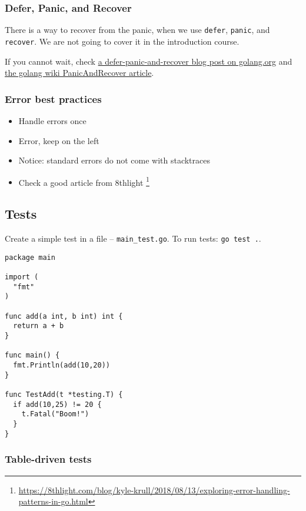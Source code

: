 \documentclass[11pt, letterpaper]{article}
\begin{document}
\subsubsection{Defer, Panic, and Recover}

There is a way to recover from the panic, when we use \verb|defer|, \verb|panic|, and \verb|recover|. We are not going to cover it in the introduction course.

If you cannot wait, check \href{https://blog.golang.org/defer-panic-and-recover}{a defer-panic-and-recover blog post on golang.org} and \href{https://github.com/golang/go/wiki/PanicAndRecover}{the golang wiki PanicAndRecover article}.

\subsubsection{Error best practices}

\begin{itemize}
\item Handle errors once
\item Error, keep on the left
\item Notice: standard errors do not come with stacktraces
\item Check a good article from 8thlight \footnote{\href{https://8thlight.com/blog/kyle-krull/2018/08/13/exploring-error-handling-patterns-in-go.html}{https://8thlight.com/blog/kyle-krull/2018/08/13/exploring-error-handling-patterns-in-go.html}}
\end{itemize}

\pagebreak
\subsection{Tests}

Create a simple test in a file -- \verb|main_test.go|. To run tests: \verb|go test .|.

\begin{verbatim}
package main

import (
  "fmt"
)

func add(a int, b int) int {
  return a + b
}

func main() {
  fmt.Println(add(10,20))
}

func TestAdd(t *testing.T) {
  if add(10,25) != 20 {
    t.Fatal("Boom!")
  }
}
\end{verbatim}

\pagebreak
\subsubsection{Table-driven tests}
\end{document}
